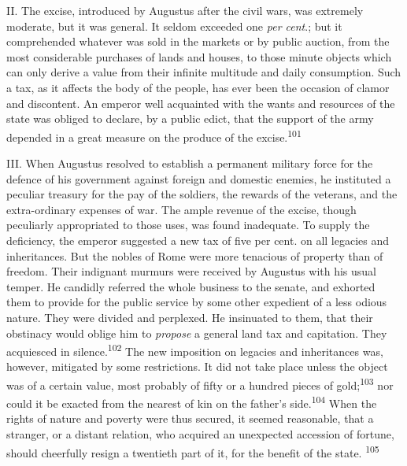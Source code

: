 
II. The excise, introduced by Augustus after the civil wars, was
extremely moderate, but it was general. It seldom exceeded one
\textit{per cent}.; but it comprehended whatever was sold in the markets
or by public auction, from the most considerable purchases of
lands and houses, to those minute objects which can only derive a
value from their infinite multitude and daily consumption. Such a
tax, as it affects the body of the people, has ever been the
occasion of clamor and discontent. An emperor well acquainted
with the wants and resources of the state was obliged to declare,
by a public edict, that the support of the army depended in a
great measure on the produce of the excise.\textsuperscript{101}


III. When Augustus resolved to establish a permanent military
force for the defence of his government against foreign and
domestic enemies, he instituted a peculiar treasury for the pay
of the soldiers, the rewards of the veterans, and the
extra-ordinary expenses of war. The ample revenue of the excise,
though peculiarly appropriated to those uses, was found
inadequate. To supply the deficiency, the emperor suggested a new
tax of five per cent. on all legacies and inheritances. But the
nobles of Rome were more tenacious of property than of freedom.
Their indignant murmurs were received by Augustus with his usual
temper. He candidly referred the whole business to the senate,
and exhorted them to provide for the public service by some other
expedient of a less odious nature. They were divided and
perplexed. He insinuated to them, that their obstinacy would
oblige him to \textit{propose} a general land tax and capitation. They
acquiesced in silence.\textsuperscript{102} The new imposition on legacies and
inheritances was, however, mitigated by some restrictions. It did
not take place unless the object was of a certain value, most
probably of fifty or a hundred pieces of gold;\textsuperscript{103} nor could it
be exacted from the nearest of kin on the father’s side.\textsuperscript{104} When
the rights of nature and poverty were thus secured, it seemed
reasonable, that a stranger, or a distant relation, who acquired
an unexpected accession of fortune, should cheerfully resign a
twentieth part of it, for the benefit of the state. \textsuperscript{105}

